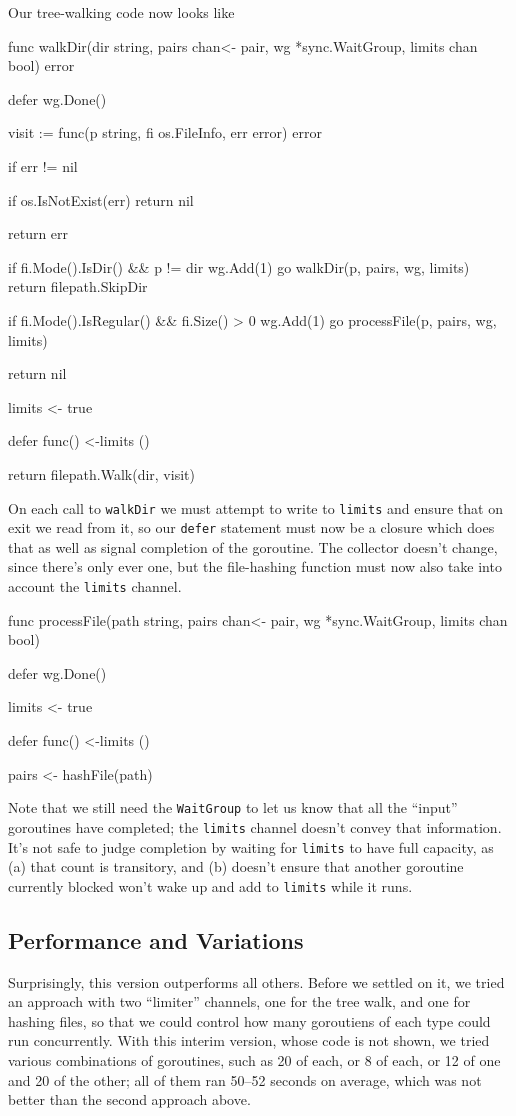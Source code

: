 \documentclass[12pt,notitlepage]{article}
\begin{document}
Our tree-walking code now looks like

\begin{golang}
func walkDir(dir string, pairs chan<- pair, wg *sync.WaitGroup,
             limits chan bool) error {
	defer wg.Done()

	visit := func(p string, fi os.FileInfo, err error) error {
		if err != nil {
			if os.IsNotExist(err) {
				return nil
			}

			return err
		}

		if fi.Mode().IsDir() && p != dir {
			wg.Add(1)
			go walkDir(p, pairs, wg, limits)
			return filepath.SkipDir
		}

		if fi.Mode().IsRegular() && fi.Size() > 0 {
			wg.Add(1)
			go processFile(p, pairs, wg, limits)
		}

		return nil
	}

	limits <- true

	defer func() {
		<-limits
	}()

	return filepath.Walk(dir, visit)
}
\end{golang}

On each call to \verb|walkDir| we must attempt to write to \verb|limits| and
ensure that on exit we read from it, so our \verb|defer| statement must now
be a closure which does that as well as signal completion of the goroutine.
The collector doesn't change, since there's only ever one, but the file-hashing
function must now also take into account the \verb|limits| channel.
\begin{golang}
func processFile(path string, pairs chan<- pair, wg *sync.WaitGroup,
                 limits chan bool) {
    defer wg.Done()

	limits <- true

	defer func() {
		<-limits		
	}()

	pairs <- hashFile(path)
}
\end{golang}

Note that we still need the \verb|WaitGroup| to let us know that all the ``input''
goroutines have completed; the \verb|limits| channel doesn't convey that information.
It's not safe to judge completion by waiting for \verb|limits| to have full
capacity, as (a) that count is transitory, and (b) doesn't ensure that another
goroutine currently blocked won't wake up and add to \verb|limits| while it runs.

\subsection{Performance and Variations}
Surprisingly, this version outperforms all others. Before we settled on it, we
tried an approach with two ``limiter'' channels, one for the tree walk, and one
for hashing files, so that we could control how many goroutiens of each type could
run concurrently. With this interim version, whose code is not shown, we tried
various combinations of goroutines, such as 20 of each, or 8 of each, or 12 of
one and 20 of the other; all of them ran 50--52 seconds on average, which was not
better than the second approach above.
\end{document}
